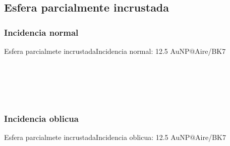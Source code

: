   \subsection{Esfera parcialmente incrustada}
    \subsubsection{Incidencia normal}
      \begin{frame}{Esfera parcialmete incrustada}{Incidencia normal: 12.5 AuNP$@$Aire/BK7}
      \centering
      \begin{columns}
      \begin{figure}    \centering \fontsize{4}{5}\selectfont
          \def\svgwidth{.96\textwidth}
          \\
          \def\svgwidth{.96\textwidth}
          \hspace{.5em}%
      \end{figure}
      \begin{figure}\centering
        \def\svgwidth{.8\textwidth}\vspace*{-2em} \fontsize{4}{5}\selectfont
      \end{figure}
      \end{columns}
      \end{frame}


    \subsubsection{Incidencia oblicua}
      \begin{frame}{Esfera parcialmete incrustada}{Incidencia oblicua: 12.5 AuNP$@$Aire/BK7}
      \vspace{-3.5em}\begin{columns}\scriptsize
      	\begin{table} \end{table}%
      	\begin{figure}\centering\fontsize{4}{5}\selectfont
          \def\svgwidth{.9\textwidth}
      \end{figure}
      \end{columns}
      \end{frame}


